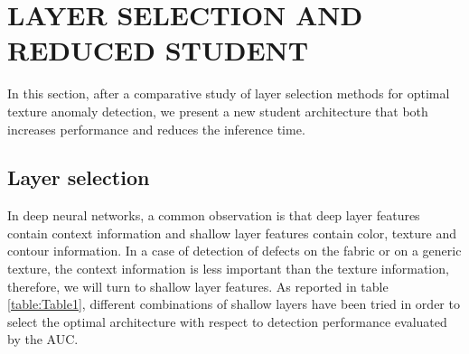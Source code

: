 \documentclass[a4paper,twoside]{article}
\begin{document}
\section{LAYER SELECTION AND REDUCED STUDENT}
In this section, after a comparative study of  layer selection methods for optimal texture anomaly detection, we present a new student architecture that both increases performance and reduces the inference time.
\subsection{Layer selection} 
 In deep neural networks, a common observation is that deep layer features contain context information and shallow layer features contain color, texture and contour information. In a case of detection of defects on the fabric or on a generic texture, the context information is less important than the texture information, therefore, we will turn to shallow layer features. As reported in table \ref{table:Table1}, different combinations of shallow layers have been tried in order to select the optimal architecture with respect to detection performance evaluated by the AUC.
\begin{table}[h]
	\centering
	\caption{\textbf{Layers selection results}}
	\footnotesize
	\setlength{\tabcolsep}{9pt}
	\renewcommand{\arraystretch}{1.3}
\end{table}
\end{document}

